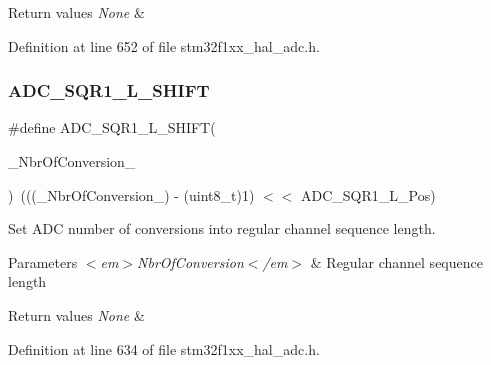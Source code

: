 \begin{DoxyRetVals}{Return values}
{\em None} & \\
\hline
\end{DoxyRetVals}


Definition at line 652 of file stm32f1xx\+\_\+hal\+\_\+adc.\+h.

\mbox{\label{group___a_d_c___private___macros_ga2b29c0e46fa4205f77b15fe7c3425fb8}} 
\subsubsection{\texorpdfstring{A\+D\+C\+\_\+\+S\+Q\+R1\+\_\+\+L\+\_\+\+S\+H\+I\+FT}{ADC\_SQR1\_L\_SHIFT}}
{\footnotesize\ttfamily \#define A\+D\+C\+\_\+\+S\+Q\+R1\+\_\+\+L\+\_\+\+S\+H\+I\+FT(\begin{DoxyParamCaption}\item[{}]{\+\_\+\+Nbr\+Of\+Conversion\+\_\+ }\end{DoxyParamCaption})~(((\+\_\+\+Nbr\+Of\+Conversion\+\_\+) -\/ (uint8\+\_\+t)1) $<$$<$ A\+D\+C\+\_\+\+S\+Q\+R1\+\_\+\+L\+\_\+\+Pos)}



Set A\+DC number of conversions into regular channel sequence length. 


\begin{DoxyParams}{Parameters}
{\em $<$em$>$\+Nbr\+Of\+Conversion$<$/em$>$} & Regular channel sequence length \\
\hline
\end{DoxyParams}

\begin{DoxyRetVals}{Return values}
{\em None} & \\
\hline
\end{DoxyRetVals}


Definition at line 634 of file stm32f1xx\+\_\+hal\+\_\+adc.\+h.

\mbox{\label{group___a_d_c___private___macros_ga89869cd79b14d222a9b235bd150fc512}} 
